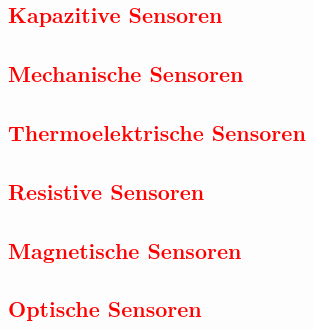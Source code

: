		\subsection{\textcolor{red}{Kapazitive Sensoren}}
		\subsection{\textcolor{red}{Mechanische Sensoren}}
		\subsection{\textcolor{red}{Thermoelektrische Sensoren}}
		\subsection{\textcolor{red}{Resistive Sensoren}}
		\subsection{\textcolor{red}{Magnetische Sensoren}}
		\subsection{\textcolor{red}{Optische Sensoren}}
